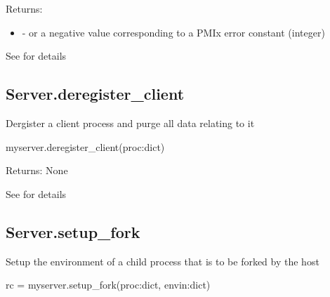 Returns:

\begin{itemize}
    \item {} -  or a negative value corresponding to a PMIx error constant (integer)
\end{itemize}


See  for details


\subsection{Server.deregister_client}

\summary
Dergister a client process and purge all data relating to it


\format

\pyspecificstart
\begin{codepar}
myserver.deregister_client(proc:dict)
\end{codepar}
\pyspecificend


\begin{arglist}
\end{arglist}

Returns: None


See  for details


\subsection{Server.setup_fork}

\summary
Setup the environment of a child process that is to be forked
by the host

\format

\pyspecificstart
\begin{codepar}
rc = myserver.setup_fork(proc:dict, envin:dict)
\end{codepar}
\pyspecificend


\begin{arglist}
\end{arglist}

